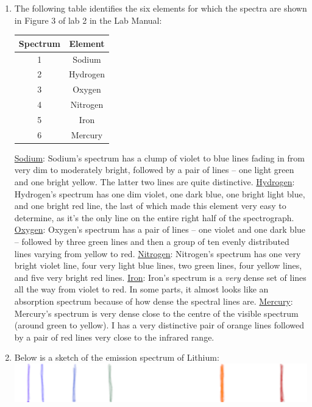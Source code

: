 \documentclass[11pt]{article}
\begin{document}
\begin{enumerate}[label={\textbf{\emph{(\arabic*)}}}]
	\item %
The following table identifies the six elements for which the spectra are shown in Figure 3 of lab 2 in the Lab Manual:
\begin{center}
\begin{tabular}{| c | c |}
	\hline
	Spectrum & Element\\ \hline
	1 & Sodium\\ \hline
	2 & Hydrogen\\ \hline
	3 & Oxygen\\ \hline
	4 & Nitrogen\\ \hline
	5 & Iron\\ \hline
	6 & Mercury\\
	\hline
\end{tabular}
\end{center}
\underline{Sodium}: Sodium's spectrum has a clump of violet to blue lines fading in from very dim to moderately bright, followed by a pair of lines -- one light green and one bright yellow.
The latter two lines are quite distinctive.
\newline
\underline{Hydrogen}: Hydrogen's spectrum has one dim violet, one dark blue, one bright light blue, and one bright red line, the last of which made this element very easy to determine, as it's the only line on the entire right half of the spectrograph.
\newline
\underline{Oxygen}: Oxygen's spectrum has a pair of lines -- one violet and one dark blue -- followed by three green lines and then a group of ten evenly distributed lines varying from yellow to red.
\newline
\underline{Nitrogen}: Nitrogen's spectrum has one very bright violet line, four very light blue lines, two green lines, four yellow lines, and five very bright red lines.
\newline
\underline{Iron}: Iron's spectrum is a \emph{very} dense set of lines all the way from violet to red.
In some parts, it almost looks like an absorption spectrum because of how dense the spectral lines are.
\newline
\underline{Mercury}: Mercury's spectrum is very dense close to the centre of the visible spectrum (around green to yellow).
I has a very distinctive pair of orange lines followed by a pair of red lines very close to the infrared range.

	\item %
Below is a sketch of the emission spectrum of Lithium:
\newline
\newline
\includegraphics[scale=0.4]{Li.png}


\end{enumerate}
\end{document}
